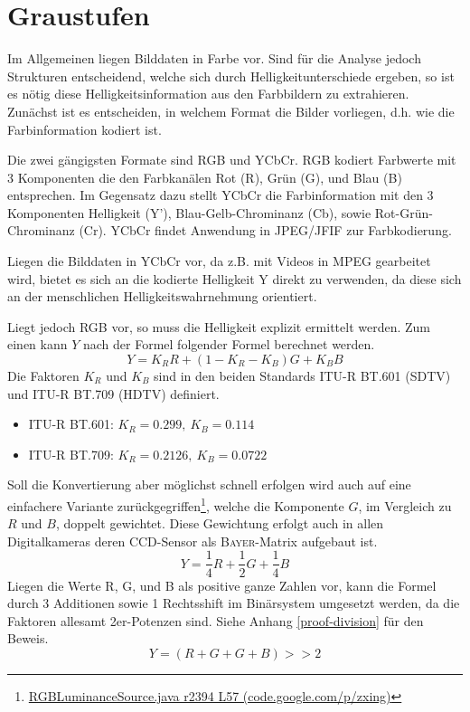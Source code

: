 \section{Graustufen}
\writtenby{\dcauthornameewie}%
Im Allgemeinen liegen Bilddaten in Farbe vor.
Sind für die Analyse jedoch Strukturen entscheidend, welche sich durch Helligkeitunterschiede ergeben, so ist es nötig diese Helligkeitsinformation aus den Farbbildern zu extrahieren.
Zunächst ist es entscheiden, in welchem Format die Bilder vorliegen, d.h. wie die Farbinformation kodiert ist.

Die zwei gängigsten Formate sind RGB und YCbCr.
RGB kodiert Farbwerte mit 3 Komponenten die den Farbkanälen Rot (R), Grün (G), und Blau (B) entsprechen.
Im Gegensatz dazu stellt YCbCr die Farbinformation mit den 3 Komponenten Helligkeit (Y'), Blau-Gelb-Chrominanz (Cb), sowie Rot-Grün-Chrominanz (Cr).
YCbCr findet Anwendung in JPEG/JFIF \cite{jfif} zur Farbkodierung.

Liegen die Bilddaten in YCbCr vor, da z.B. mit Videos in MPEG gearbeitet wird, bietet es sich an die kodierte Helligkeit Y direkt zu verwenden, da diese sich an der menschlichen Helligkeitswahrnehmung orientiert.

Liegt jedoch RGB vor, so muss die Helligkeit explizit ermittelt werden.
Zum einen kann $Y$ nach der Formel folgender Formel \cite[2.5.1]{itu/rec/601} berechnet werden.
\begin{equation}
  Y = K_R R + (1 - K_R - K_B) G + K_B B
\end{equation}
Die Faktoren $K_R$ und $K_B$ sind in den beiden Standards ITU-R BT.601 (SDTV) und ITU-R BT.709 (HDTV) definiert.
%
\begin{itemize}
\item ITU-R BT.601: $K_R=0.299,~K_B=0.114$ \cite[2.5.1]{itu/rec/601}
\item ITU-R BT.709: $K_R=0.2126,~K_B=0.0722$ \cite[4]{itu/rec/709}
\end{itemize}
%
Soll die Konvertierung aber möglichst schnell erfolgen wird auch auf eine einfachere Variante zurückgegriffen\footnote{\href{https://code.google.com/p/zxing/source/browse/trunk/core/src/com/google/zxing/RGBLuminanceSource.java?spec=svn2633&r=2394\#57}{RGBLuminanceSource.java r2394 L57 (code.google.com/p/zxing)}}, welche die Komponente $G$, im Vergleich zu $R$ und $B$, doppelt gewichtet.
Diese Gewichtung erfolgt auch in allen Digitalkameras deren CCD-Sensor als \textsc{Bayer}-Matrix aufgebaut ist.
\begin{equation}
  Y = \frac{1}{4} R + \frac{1}{2} G + \frac{1}{4}B
\end{equation}
Liegen die Werte R, G, und B als positive ganze Zahlen vor, kann die Formel durch 3 Additionen sowie 1 Rechtsshift im Binärsystem umgesetzt werden, da die Faktoren allesamt 2er-Potenzen sind.
Siehe Anhang \ref{proof-division} für den Beweis.
\begin{equation}
  Y = (R + G + G + B) >\!\!> 2
\end{equation}
